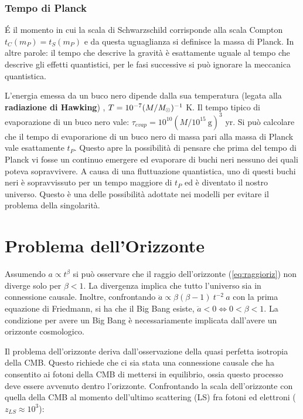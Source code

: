 \subsubsection{Tempo di Planck}
É il momento in cui la scala di Schwarzschild corrisponde alla scala Compton $t_C(m_P)=t_S(m_P)$ e da questa uguaglianza si definisce la massa di Planck. In altre parole: il tempo che descrive la gravità è esattamente uguale al tempo che descrive gli effetti quantistici, per le fasi successive si può ignorare la meccanica quantistica.

L'energia emessa da un buco nero dipende dalla sua temperatura (legata alla \textbf{radiazione di Hawking}) , $T=10^{-7} (M/\textit{M}_\odot)^{-1}$ K. Il tempo tipico di evaporazione di un buco nero vale: $\tau_{evap}=10^{10} (M/10^{15}~\textrm{g})^{3} $ yr. Si può calcolare che il tempo di evaporarione di un buco nero di massa pari alla massa di Planck vale esattamente $t_P$. Questo apre la possibilità di pensare che prima del tempo di Planck vi fosse un continuo emergere ed evaporare di buchi neri nessuno dei quali poteva sopravvivere. A causa di una fluttuazione quantistica, uno di questi buchi neri è sopravvissuto per un tempo maggiore di $t_P$ ed è diventato il nostro universo. Questo è una delle possibilità adottate nei modelli per evitare il problema della singolarità. 





\section{Problema dell'Orizzonte}
Assumendo $a\propto t^\beta$ si può osservare che il raggio dell'orizzonte (\ref{eq:raggioriz}) non diverge solo per $\beta < 1$. La divergenza implica che tutto l'universo sia in connessione causale. Inoltre, confrontando $\ddot{a}\propto \beta (\beta-1) ~t^{-2} ~a $ con la prima equazione di Friedmann, si ha che il Big Bang esiste, $\ddot{a} < 0 \Leftrightarrow 0 < \beta < 1$. La condizione per avere un Big Bang è necessariamente implicata dall'avere un orizzonte cosmologico. 

Il problema dell'orizzonte deriva dall'osservazione della quasi perfetta isotropia della CMB. Questo richiede che ci sia stata una connessione causale che ha consentito ai fotoni della CMB di mettersi in equilibrio, ossia questo processo deve essere avvenuto dentro l'orizzonte. Confrontando la scala dell'orizzonte con quella della CMB al momento dell'ultimo scattering (LS) fra fotoni ed elettroni ($z_{LS}\approx 10^3$):

